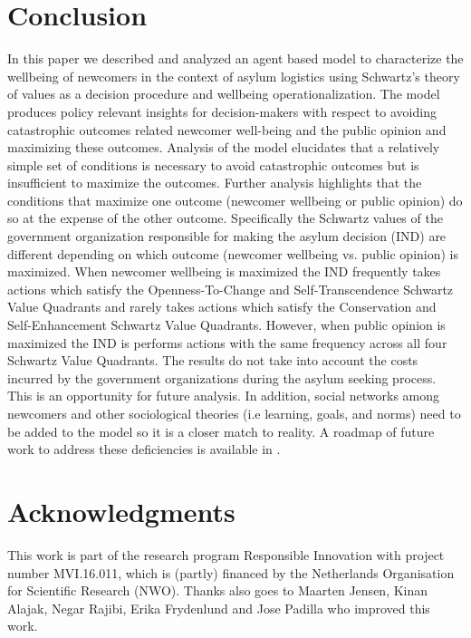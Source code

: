 \documentclass{scspaperproc}
\theoremstyle{scsthe}
\begin{document}
\section{Conclusion}
\label{sec:discussion}
In this paper we described and analyzed an agent based model to characterize the wellbeing of newcomers in the context of asylum logistics using Schwartz's theory of values as a decision procedure and wellbeing operationalization. The model produces policy relevant insights for decision-makers with respect to avoiding catastrophic outcomes related newcomer well-being and the public opinion and maximizing these outcomes. Analysis of the model elucidates that a relatively simple set of conditions is necessary to avoid catastrophic outcomes but is insufficient to maximize the outcomes. Further analysis highlights that the conditions that maximize one outcome (newcomer wellbeing or public opinion) do so at the expense of the other outcome. Specifically the Schwartz values of the government organization responsible for making the asylum decision (IND) are different depending on which outcome (newcomer wellbeing vs. public opinion) is maximized. When newcomer wellbeing is maximized the IND frequently takes actions which satisfy the Openness-To-Change and Self-Transcendence Schwartz Value Quadrants and rarely takes actions which satisfy the Conservation and Self-Enhancement Schwartz Value Quadrants. However, when public opinion is maximized the IND is performs actions with the same frequency across all four Schwartz Value Quadrants. The results do not take into account the costs incurred by the government organizations during the asylum seeking process. This is an opportunity for future analysis. In addition, social networks among newcomers and other sociological theories (i.e learning, goals, and norms) need to be added to the model so it is a closer match to reality. A roadmap of future work to address these deficiencies is available in \cite{phil.masters.thesis}. 
\section*{Acknowledgments}
This work is part of the research program Responsible Innovation with project number MVI.16.011, which is (partly) financed by the Netherlands Organisation for Scientific Research (NWO). Thanks also goes to Maarten Jensen, Kinan Alajak, Negar Rajibi, Erika Frydenlund and Jose Padilla who improved this work.


\end{document}
